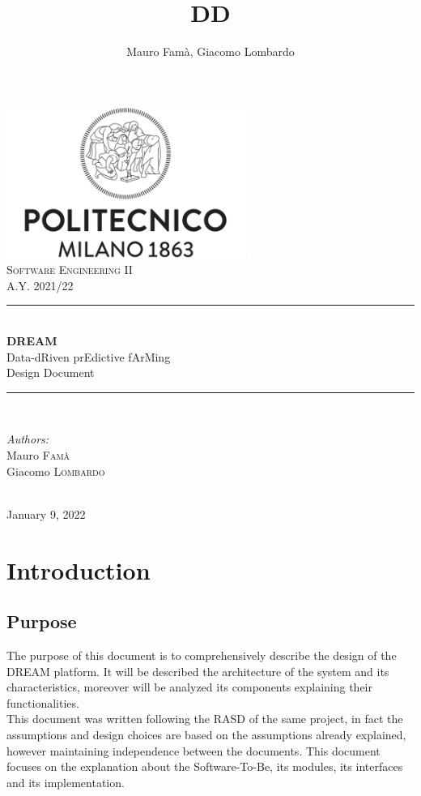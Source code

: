 \documentclass[10pt]{article} %
\title{DD}
\author{Mauro Famà, Giacomo Lombardo}
\begin{document}
\thispagestyle{empty}
\begin{titlepage}
    \newcommand{\HRule}{\rule{\linewidth}{0.5mm}}
    \center
    \includegraphics[width=8cm]{polimi.png}\\[1cm]

    \textsc{\Large Software Engineering II}\\[0.5cm]
    \textsc{\large A.Y. 2021/22}\\[0.5cm]

    \HRule \\[0.4cm]
        { \Huge \bfseries DREAM}\\[0.2cm]
        { \large Data-dRiven prEdictive fArMing}\\[0.4cm]
        { \LARGE Design Document}
    \HRule \\[1.5cm]

    \begin{minipage}{0.4\textwidth}
        \begin{flushleft} \large
        \emph{Authors:}\\
        Mauro \textsc{Famà}\\
        Giacomo \textsc{Lombardo}\\
        \end{flushleft}
    \end{minipage}\\[2cm]

    {\large January 9, 2022}\\[2cm]
    
    \vfill
\end{titlepage}
\newpage
\tableofcontents %
\newpage
\section{Introduction}
\subsection{Purpose}
The purpose of this document is to comprehensively describe the design of the DREAM platform. %
It will be described the architecture of the system and its characteristics, 
moreover will be analyzed its components explaining their functionalities.\\
This document was written following the RASD of the same project, 
in fact the assumptions and design choices are based on the assumptions already explained, 
however maintaining independence between the documents. This document focuses on the explanation 
about the Software-To-Be, its modules, its interfaces and its implementation.
\end{document}
